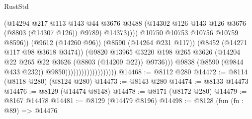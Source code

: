 \begin{lexlean}{RustStd}
\begin{coremodule}
                                                      (@14294
                                                        @217
                                                        @113
                                                        @143
                                                        @44
                                                        @3676
                                                        @3488
                                                        (@14302
                                                          @126
                                                          @143
                                                          @126
                                                          @3676
                                                          (@8803 (@14307 @126))
                                                          @9789)
                                                        @14373))))
                                                @10750
                                                @10753
                                                @10756
                                                @10759
                                                @8596))
                                            (@9612 (@14260 @96))
                                            (@8590 (@14264 @231 @117))
                                            (@8452 (@14271 @117 @98 @3618 @3474))
                                            (@9820
                                              @13965
                                              @3220
                                              @198
                                              @265
                                              @3626
                                              (@14204
                                                @22
                                                @265
                                                @22
                                                @3626
                                                (@8803 (@14209 @22))
                                                @9736)))
                                          @9838
                                          (@8590 (@9844 @433 @232))
                                          @9850)))))))))))))))))))
@14468 := @8112 @280
@14472 := @8114 (@8118 @280) (@8124 @280)
@14473 := @8143 @280
@14474 := @8133 @14473
@14476 := @8129 (@14474 @8148)
@14478 := @8171 (@8172 @280)
@14479 := @8167 @14478
@14481 := @8129 (@14479 @8196)
@14498 := @8128
    (fun (fn : @89) =>
    @14476

\end{coremodule}
\end{lexlean}
